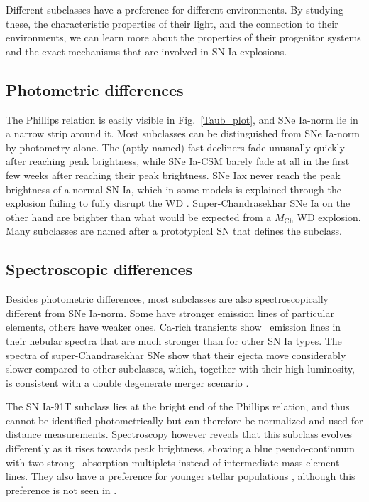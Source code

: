 \documentclass[a4paper,oneside,12pt, class=Latex/Classes/PhDthesisPSnPDF, crop=false]{standalone}
\begin{document}
Different subclasses have a preference for different environments. By studying these, the characteristic properties of their light, and the connection to their environments, we can learn more about the properties of their progenitor systems and the exact mechanisms that are involved in SN Ia explosions.


\subsection{Photometric differences}
The Phillips relation is easily visible in Fig.~\ref{Taub_plot}, and SNe Ia-norm lie in a narrow strip around it. Most subclasses can be distinguished from SNe Ia-norm by photometry alone. The (aptly named) fast decliners fade unusually quickly after reaching peak brightness, while SNe Ia-CSM barely fade at all in the first few weeks after reaching their peak brightness. SNe Iax never reach the peak brightness of a normal SN Ia, which in some models is explained through the explosion failing to fully disrupt the WD \citep{Iax_model_1, Iax_model_2}. Super-Chandrasekhar SNe Ia on the other hand are brighter than what would be expected from a $M_\text{Ch}$ WD explosion. Many subclasses are named after a prototypical SN that defines the subclass.


\subsection{Spectroscopic differences}
Besides photometric differences, most subclasses are also spectroscopically different from SNe Ia-norm. Some have stronger emission lines of particular elements, others have weaker ones. Ca-rich transients \citep[e.g.][]{Ca-rich_2010, Ca_rich_2012, Ca-rich_rate} show \CaII\ emission lines in their nebular spectra that are much stronger than for other SN Ia types. The spectra of super-Chandrasekhar SNe show that their ejecta move considerably slower compared to other subclasses, which, together with their high luminosity, is consistent with a double degenerate merger scenario \citep{2003fg_SuperCh, 06gz_SuperCh, 09dc_SuperCh}.

The SN Ia-91T subclass lies at the bright end of the Phillips relation, and thus cannot be identified photometrically but can therefore be normalized and used for distance measurements. Spectroscopy however reveals that this subclass evolves differently as it rises towards peak brightness, showing a blue pseudo-continuum with two strong \FeIII\ absorption multiplets instead of intermediate-mass element lines. They also have a preference for younger stellar populations \citep{Filippenko_91t, 91T}, although this preference is not seen in \citet{DR2_diversity}.
\end{document}
